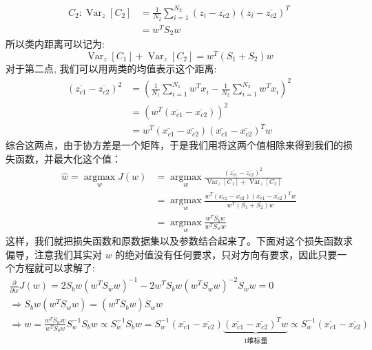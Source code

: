 \begin{equation}
\begin{aligned}
C_{2}: \operatorname{Var}_{z}\left[C_{2}\right] & =\frac{1}{N_{2}} \sum_{i=1}^{N_{2}}\left(z_{i}-\overline{z_{c 2}}\right)\left(z_{i}-\overline{z_{c 2}}\right)^{T} \\
& =w^{T} S_{2} w
\end{aligned}
\end{equation}
所以类内距离可以记为:
\begin{equation}
\operatorname{Var}_{z}\left[C_{1}\right]+\operatorname{Var}_{z}\left[C_{2}\right]=w^{T}\left(S_{1}+S_{2}\right) w
\end{equation}
对于第二点, 我们可以用两类的均值表示这个距离:
\begin{equation}
\begin{aligned}
\left(\overline{z_{c 1}}-\overline{z_{c 2}}\right)^{2} & =\left(\frac{1}{N_{1}} \sum_{i=1}^{N_{1}} w^{T} x_{i}-\frac{1}{N_{2}} \sum_{i=1}^{N_{2}} w^{T} x_{i}\right)^{2} \\
& =\left(w^{T}\left(\overline{x_{c 1}}-\overline{x_{c 2}}\right)\right)^{2} \\
& =w^{T}\left(\overline{x_{c 1}}-\overline{x_{c 2}}\right)\left(\overline{x_{c 1}}-\overline{x_{c 2}}\right)^{T} w
\end{aligned}
\end{equation}
综合这两点，由于协方差是一个矩阵，于是我们用将这两个值相除来得到我们的损失函数，并最大化这个值：
\begin{equation}
\begin{aligned}
\hat{w}=\underset{w}{\operatorname{argmax}} J(w) & =\underset{w}{\operatorname{argmax}} \frac{\left(\overline{z_{c 1}}-\overline{z_{c 2}}\right)^{2}}{\operatorname{Var}_{z}\left[C_{1}\right]+\operatorname{Var}_{z}\left[C_{2}\right]} \\
& =\underset{w}{\operatorname{argmax}} \frac{w^{T}\left(\overline{x_{c 1}}-\overline{x_{c 2}}\right)\left(\overline{x_{c 1}}-\overline{x_{c 2}}\right)^{T} w}{w^{T}\left(S_{1}+S_{2}\right) w} \\
& =\underset{w}{\operatorname{argmax}} \frac{w^{T} S_{b} w}{w^{T} S_{w} w}
\end{aligned}
\end{equation}
这样，我们就把损失函数和原数据集以及参数结合起来了。下面对这个损失函数求偏导，注意我们其实对 $w$ 的绝对值没有任何要求，只对方向有要求，因此只要一个方程就可以求解了:
\begin{equation}
\begin{array}{l}
\frac{\partial}{\partial w} J(w)=2 S_{b} w\left(w^{T} S_{w} w\right)^{-1}-2 w^{T} S_{b} w\left(w^{T} S_{w} w\right)^{-2} S_{w} w=0 \\
\Longrightarrow S_{b} w\left(w^{T} S_{w} w\right)=\left(w^{T} S_{b} w\right) S_{w} w \\
\Longrightarrow w=\frac{w^TS_ww}{w^TS_bw}S_{w}^{-1}S_bw\propto S_{w}^{-1}S_bw=S_{w}^{-1}\left( \overline{x_{c1}}-\overline{x_{c2}} \right) \underset{1\text{维标量}}{\underbrace{\left( \overline{x_{c1}}-\overline{x_{c2}} \right) ^Tw}}\propto S_{w}^{-1}\left( \overline{x_{c1}}-\overline{x_{c2}} \right) 
\end{array}
\end{equation}
